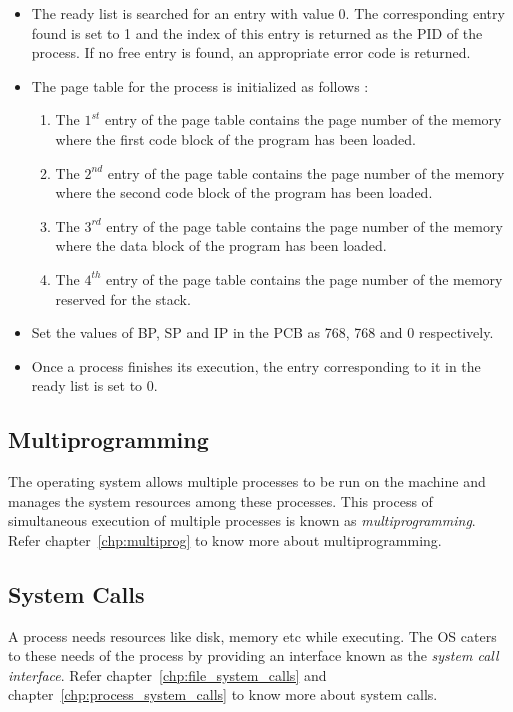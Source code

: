 \begin{itemize}
	\item The ready list is searched for an entry with value 0. The corresponding entry found is set to 1 and the index of this entry is returned as the PID of the process. If no free entry is found, an appropriate error code is returned.
	\item The page table for the process is initialized as follows :
	\begin{enumerate}
		\item The $1^{st}$ entry of the page table contains the page number of the memory where the first code block of the program has been loaded.
		\item The $2^{nd}$ entry of the page table contains the page number of the memory where the second code block of the program has been loaded.
		\item The $3^{rd}$ entry of the page table contains the page number of the memory where the data block of the program has been loaded.
		\item The $4^{th}$ entry of the page table contains the page number of the memory reserved for the stack.
	\end{enumerate}
	\item Set the values of BP, SP and IP in the PCB as 768, 768 and 0 respectively.
	\item Once a process finishes its execution, the entry corresponding to it in the ready list is set to 0.
\end{itemize}

\subsection{Multiprogramming}
The operating system allows multiple processes to be run on the machine and manages the system resources among these processes. 
This process of simultaneous execution of multiple processes is known as \emph{multiprogramming}. Refer chapter~\ref{chp:multiprog} to know more about multiprogramming.

\subsection{System Calls}
A process needs resources like disk, memory etc while executing. The OS caters to these needs of the process by providing an interface  known as the \emph{system call interface}. Refer chapter~\ref{chp:file_system_calls} and chapter~\ref{chp:process_system_calls} to know more about system calls.

